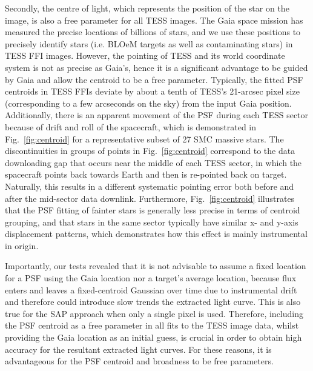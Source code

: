 \documentclass[fleqn,usenatbib]{mnras}
\begin{document}
Secondly, the centre of light, which represents the position of the star on the image, is also a free parameter for all TESS images. The {\sc Gaia} space mission \citep{Gaia2016,Gaia2021,Gaia2023} has measured the precise locations of billions of stars, and we use these positions to precisely identify stars (i.e. BLOeM targets as well as contaminating stars) in TESS FFI images. However, the pointing of TESS and its world coordinate system is not as precise as {\sc Gaia}'s, hence it is a significant advantage to be guided by {\sc Gaia} and allow the centroid to be a free parameter. Typically, the fitted PSF centroids in TESS FFIs deviate by about a tenth of TESS's 21-arcsec pixel size (corresponding to a few arcseconds on the sky) from the input {\sc Gaia} position. Additionally, there is an apparent movement of the PSF during each TESS sector because of drift and roll of the spacecraft, which is demonstrated in Fig.~\ref{fig:centroid} for a representative subset of 27 SMC massive stars. The discontinuities in groups of points in Fig.~\ref{fig:centroid} correspond to the data downloading gap that occurs near the middle of each TESS sector, in which the spacecraft points back towards Earth and then is re-pointed back on target. Naturally, this results in a different systematic pointing error both before and after the mid-sector data downlink. Furthermore, Fig.~\ref{fig:centroid} illustrates that the PSF fitting of fainter stars is generally less precise in terms of centroid grouping, and that stars in the same sector typically have similar x- and y-axis displacement patterns, which demonstrates how this effect is mainly instrumental in origin. 

Importantly, our tests revealed that it is not advisable to assume a fixed location for a PSF using the {\sc Gaia} location nor a target's average location, because flux enters and leaves a fixed-centroid Gaussian over time due to instrumental drift and therefore could introduce slow trends the extracted light curve. This is also true for the SAP approach when only a single pixel is used. Therefore, including the PSF centroid as a free parameter in all fits to the TESS image data, whilst providing the {\sc Gaia} location as an initial guess, is crucial in order to obtain high accuracy for the resultant extracted light curves. For these reasons, it is advantageous for the PSF centroid and broadness to be free parameters.
\end{document}
